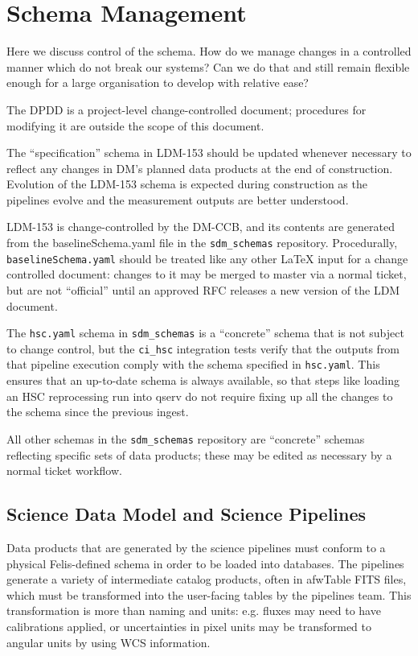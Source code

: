 \section{Schema Management}

Here we discuss control of the schema.
How do we manage changes in a controlled manner which do not break our systems?
Can we do that and still remain flexible enough for a large organisation to develop with relative ease?

The DPDD is a project-level change-controlled document; procedures for modifying it are outside the
scope of this document.

The ``specification'' schema in LDM-153 should be updated whenever necessary to reflect any changes
in DM's planned data products at the end of construction. Evolution of the LDM-153 schema is
expected during construction as the pipelines evolve and the measurement outputs are better
understood.

LDM-153 is change-controlled by the DM-CCB, and its contents are generated from the baselineSchema.yaml file
in the \texttt{sdm\_schemas} repository. Procedurally, \texttt{baselineSchema.yaml} should be
treated like any other LaTeX input for a change controlled document: changes to it may be merged to
master via a normal ticket, but are not ``official'' until an approved RFC releases a new version of
the LDM document.

The \texttt{hsc.yaml} schema in \texttt{sdm\_schemas} is a ``concrete'' schema that is not subject
to change control, but the \texttt{ci\_hsc} integration tests verify that the outputs from that
pipeline execution comply with the schema specified in \texttt{hsc.yaml}. This ensures that an
up-to-date schema is always available, so that steps like loading an HSC reprocessing run into qserv
do not require fixing up all the changes to the schema since the previous ingest.

All other schemas in the \texttt{sdm\_schemas} repository are ``concrete'' schemas reflecting
specific sets of data products; these may be edited as necessary by a normal ticket workflow.


\subsection{Science Data Model and Science Pipelines}
Data products that are generated by the science pipelines must conform to a physical Felis-defined
schema in order to be loaded into databases. The pipelines generate a variety of intermediate
catalog products, often in afwTable FITS files, which must be transformed into the user-facing
tables by the pipelines team. This transformation is more than naming and units: e.g. fluxes may
need to have calibrations applied, or uncertainties in pixel units may be transformed to angular
units by using WCS information.

